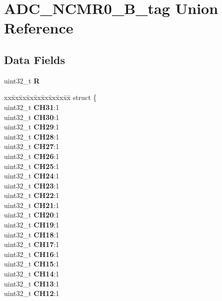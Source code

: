 \hypertarget{unionADC__NCMR0__32B__tag}{}\section{A\+D\+C\+\_\+\+N\+C\+M\+R0\+\_\+B\+\_\+tag Union Reference}
\label{unionADC__NCMR0__32B__tag}
\subsection*{Data Fields}
\begin{DoxyCompactItemize}
\item 
\mbox{\label{unionADC__NCMR0__32B__tag_a8bc393ab1a5821f52cc702adba8c74b0}} 
uint32\+\_\+t {\bfseries R}
\item 
\mbox{\label{unionADC__NCMR0__32B__tag_adfa8ba9d803205503dee44b7642f1170}} 
\begin{tabbing}
xx\=xx\=xx\=xx\=xx\=xx\=xx\=xx\=xx\=\kill
struct \{\\
\>uint32\_t {\bfseries CH31}:1\\
\>uint32\_t {\bfseries CH30}:1\\
\>uint32\_t {\bfseries CH29}:1\\
\>uint32\_t {\bfseries CH28}:1\\
\>uint32\_t {\bfseries CH27}:1\\
\>uint32\_t {\bfseries CH26}:1\\
\>uint32\_t {\bfseries CH25}:1\\
\>uint32\_t {\bfseries CH24}:1\\
\>uint32\_t {\bfseries CH23}:1\\
\>uint32\_t {\bfseries CH22}:1\\
\>uint32\_t {\bfseries CH21}:1\\
\>uint32\_t {\bfseries CH20}:1\\
\>uint32\_t {\bfseries CH19}:1\\
\>uint32\_t {\bfseries CH18}:1\\
\>uint32\_t {\bfseries CH17}:1\\
\>uint32\_t {\bfseries CH16}:1\\
\>uint32\_t {\bfseries CH15}:1\\
\>uint32\_t {\bfseries CH14}:1\\
\>uint32\_t {\bfseries CH13}:1\\
\>uint32\_t {\bfseries CH12}:1\\

\end{tabbing}
\end{DoxyCompactItemize}
